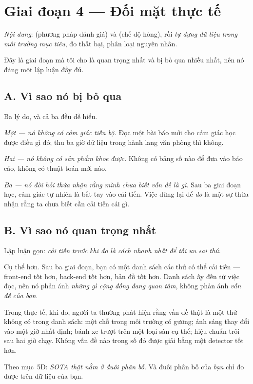 \documentclass[../../vslam.tex]{subfiles}
\begin{document}
\section{Giai đoạn 4 --- Đối mặt thực tế}

\emph{Nội dung}:  (phương pháp đánh giá) và  (chế độ hỏng), rồi \emph{tự dựng dữ liệu trong môi trường mục tiêu}, đo thất bại, phân loại nguyên nhân.

Đây là giai đoạn mà tôi cho là quan trọng nhất và bị bỏ qua nhiều nhất, nên nó đáng một lập luận đầy đủ.

\subsection{A. Vì sao nó bị bỏ qua}

Ba lý do, và cả ba đều dễ hiểu.

\emph{Một --- nó không có cảm giác tiến bộ.} Đọc một bài báo mới cho cảm giác học được điều gì đó; thu ba giờ dữ liệu trong hành lang văn phòng thì không.

\emph{Hai --- nó không có sản phẩm khoe được.} Không có bảng số nào để đưa vào báo cáo, không có thuật toán mới nào.

\emph{Ba --- nó đòi hỏi thừa nhận rằng mình chưa biết vấn đề là gì.} Sau ba giai đoạn học, cảm giác tự nhiên là bắt tay vào cải tiến. Việc dừng lại để \emph{đo} là một sự thừa nhận rằng ta chưa biết cần cải tiến cái gì.

\subsection{B. Vì sao nó quan trọng nhất}

Lập luận gọn: \emph{cải tiến trước khi đo là cách nhanh nhất để tối ưu sai thứ}.

Cụ thể hơn. Sau ba giai đoạn, bạn có một danh sách các thứ có thể cải tiến --- front-end tốt hơn, back-end tốt hơn, bản đồ tốt hơn. Danh sách ấy đến từ việc đọc, nên nó phản ánh \emph{những gì cộng đồng đang quan tâm}, không phản ánh \emph{vấn đề của bạn}.

Trong thực tế, khi đo, người ta thường phát hiện rằng vấn đề thật là một thứ không có trong danh sách: một chỗ trong môi trường có gương; ánh sáng thay đổi vào một giờ nhất định; bánh xe trượt trên một loại sàn cụ thể; hiệu chuẩn trôi sau hai giờ chạy. Không vấn đề nào trong số đó được giải bằng một detector tốt hơn.

Theo  mục~5D: \emph{SOTA thật nằm ở đuôi phân bố}. Và đuôi phân bố của \emph{bạn} chỉ đo được trên dữ liệu của bạn.
\end{document}
